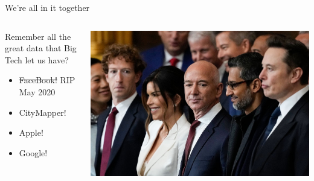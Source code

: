 \documentclass[
  ignorenonframetext,
  aspectratio=149,
]{beamer}
\providecommand{\tightlist}{%
  \setlength{\itemsep}{0pt}\setlength{\parskip}{0pt}}\usepackage{longtable,booktabs,array}
\begin{document}
\begin{frame}{We're all in it together}
\label{were-all-in-it-together-1}
\begin{columns}[T]
\begin{column}{0.6\textwidth}
Remember all the great data that Big Tech let us have?

\begin{itemize}
\tightlist
\item
  \st{FaceBook!} RIP May 2020
\item
  CityMapper!
\item
  Apple!
\item
  Google!
\end{itemize}
\end{column}

\begin{column}{0.4\textwidth}
\includegraphics{images/tech_knobs.jpeg}
\end{column}
\end{columns}
\end{frame}
\end{document}
